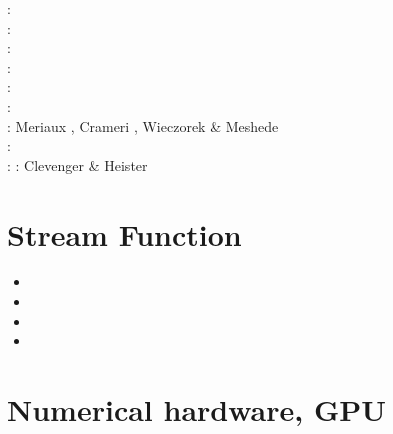 \begin{scriptsize}
\twothousandtwelve: \cite{crsg12}\cite{chgv12}\cite{krwd12}\cite{may12}\cite{gerb12}\cite{asmo12}\\
\twothousandthirteen: \cite{chtl13}\cite{kemk13}\cite{gemd13}\cite{hutm13}\\
\twothousandfourteen: \cite{thmk14}\cite{mabl14}\cite{lopp14}\cite{stlh14}\\
\twothousandfifteen: \cite{lelk15}\cite{rumi15}\cite{chpe15}\cite{mabl15}\\
\twothousandsixteen: \cite{dumy16}\cite{blmp16}\\
\twothousandseventeen: \cite{robh17}\cite{wisv17}\cite{majc17}\\
\twothousandeighteen: Meriaux \etal \cite{memm18}, Crameri \cite{cram18}, Wieczorek \& Meshede \cite{wime18}\\
\twothousandnineteen: \cite{liki19}\cite{demh19}\cite{galb19}\cite{frtv19}\cite{yuwa19}\cite{ropu19}\\
\twothousandtwenty: \cite{homb20}\cite{trlb20}\cite{gadb20}\cite{jaca20a,jaca20b} 
\twothousandtwentyone: Clevenger \& Heister \cite{clhe21}
\end{scriptsize}




\section{Stream Function} 

\begin{scriptsize}
\begin{itemize}
\item[\nineteeneightynine]
\item[\nineteenninetysix] 
\item[\nineteenninetyseven] 
\item[\nineteenninetynine] 
\end{itemize}
\end{scriptsize}

\section{Numerical hardware, GPU}
\label{sec:topics:hardware}

